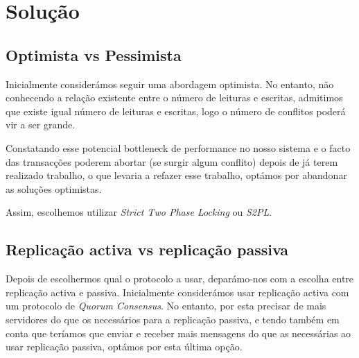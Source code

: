 \section{Solução}

\subsection{Optimista vs Pessimista}
\label{Optimista vs Pessimista}
Inicialmente considerámos seguir uma abordagem optimista. No entanto, não conhecendo a relação existente entre o número de leituras e escritas, admitimos que existe igual número de leituras e escritas, logo o número de conflitos poderá vir a ser grande. 

Constatando esse potencial bottleneck de performance no nosso sistema e o facto das transacções poderem abortar (se surgir algum conflito) depois de já terem realizado trabalho, o que levaria a refazer esse trabalho, optámos por abandonar as soluções optimistas.

Assim, escolhemos utilizar \textit{Strict Two Phase Locking} ou \textit{S2PL}.

\subsection{Replicação activa vs replicação passiva}

Depois de escolhermos qual o protocolo a usar, deparámo-nos com a escolha entre replicação activa e passiva. Inicialmente considerámos usar replicação activa com um protocolo de \textit{Quorum Consensus}. No entanto, por esta precisar de mais servidores do que os necessários para a replicação passiva, e tendo também em conta que teríamos que enviar e receber mais mensagens do que as necessárias ao usar replicação passiva, optámos por esta última opção.
